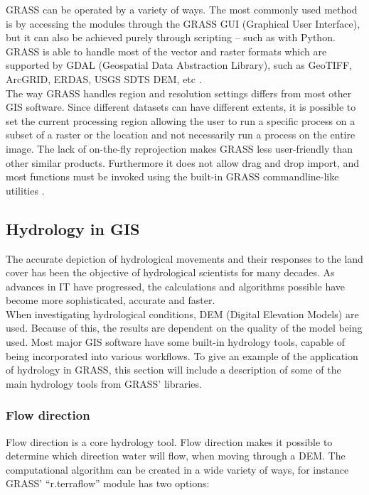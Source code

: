 GRASS can be operated by a variety of ways. The most commonly used method is by accessing the modules through the GRASS GUI (Graphical User Interface), but it can also be achieved purely through scripting – such as with Python. GRASS is able to handle most of the vector and raster formats which are supported by GDAL (Geospatial Data Abstraction Library), such as GeoTIFF, ArcGRID, ERDAS, USGS SDTS DEM, etc \citep{GRASSGIS}. \\

The way GRASS handles region and resolution settings differs from most other GIS software. Since different datasets can have different extents, it is possible to set the current processing region allowing the user to run a specific process on a subset of a raster or the location and not necessarily run a process on the entire image. 
The lack of on-the-fly reprojection makes GRASS less user-friendly than other similar products. Furthermore it does not allow drag and drop import, and most functions must be invoked using the built-in GRASS commandline-like utilities \citep{grassbook}.

\subsection{Hydrology in GIS}

The accurate depiction of hydrological movements and their responses to the land cover has been the objective of hydrological scientists for many decades. As advances in IT have progressed, the calculations and algorithms possible have become more sophisticated, accurate and faster. \\

When investigating hydrological conditions, DEM (Digital Elevation Models) are used. Because of this, the results are dependent on the quality of the model being used. Most major GIS software have some built-in hydrology tools, capable of being incorporated into various workflows. To give an example of the application of hydrology in GRASS, this section will include a description of some of the main hydrology tools from GRASS' libraries.

\subsubsection{Flow direction}
Flow direction is a core hydrology tool. Flow direction makes it possible to determine which direction water will flow, when moving through a DEM. The computational algorithm can be created in a wide variety of ways, for instance GRASS' “r.terraflow” module has two options: 


